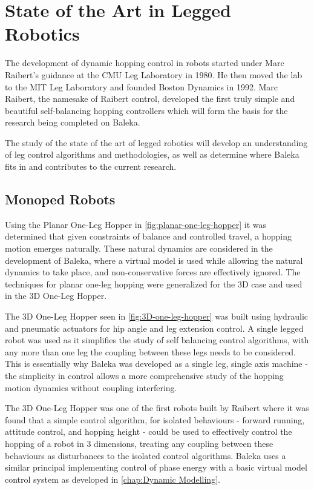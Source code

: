 \section{State of the Art in Legged Robotics}

The development of dynamic hopping control in robots started under Marc Raibert's guidance at the CMU Leg Laboratory in 1980. He then moved the lab to the MIT Leg Laboratory and founded Boston Dynamics in 1992. Marc Raibert, the namesake of Raibert control, developed the first truly simple and beautiful self-balancing hopping controllers which will form the basis for the research being completed on Baleka.\cite{Raibert1986}

The study of the state of the art of legged robotics will develop an understanding of leg control algorithms and methodologies, as well as determine where Baleka fits in and contributes to the current research.

\subsection{Monoped Robots}

Using the Planar One-Leg Hopper in \cref{fig:planar-one-leg-hopper} it was determined that given constraints of balance and controlled travel, a hopping motion emerges naturally.\cite{mitleglaboratory1999} These natural dynamics are considered in the development of Baleka, where a virtual model is used while allowing the natural dynamics to take place, and non-conservative forces are effectively ignored. The techniques for planar one-leg hopping were generalized for the 3D case and used in the 3D One-Leg Hopper.

The 3D One-Leg Hopper seen in \cref{fig:3D-one-leg-hopper} was built using hydraulic and pneumatic actuators for hip angle and leg extension control. A single legged robot was used as it simplifies the study of self balancing control algorithms, with any more than one leg the coupling between these legs needs to be considered.\cite{Raibert1984} This is essentially why Baleka was developed as a single leg, single axis machine - the simplicity in control allows a more comprehensive study of the hopping motion dynamics without coupling interfering. 

The 3D One-Leg Hopper was one of the first robots built by Raibert where it was found that a simple control algorithm, for isolated behaviours - forward running, attitude control, and hopping height - could be used to effectively control the hopping of a robot in 3 dimensions, treating any coupling between these behaviours as disturbances to the isolated control algorithms.\cite{Raibert1984} Baleka uses a similar principal implementing control of phase energy with a basic virtual model control system as developed in \cref{chap:Dynamic Modelling}.

